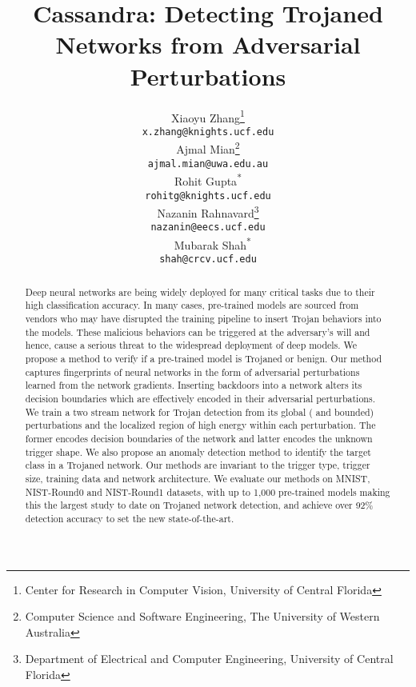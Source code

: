 \documentclass{article}
\title{Cassandra: Detecting Trojaned Networks from Adversarial Perturbations}
\author{
    Xiaoyu Zhang\thanks{Center for Research in Computer Vision, University of Central Florida} \\
    \texttt{x.zhang@knights.ucf.edu} \\
    \And
    Ajmal Mian\thanks{Computer Science and Software Engineering, The University of Western Australia} \\
    \texttt{ajmal.mian@uwa.edu.au} \\
    \And
    Rohit Gupta\textsuperscript{*} \\
    \texttt{rohitg@knights.ucf.edu} \\
    \And
    Nazanin Rahnavard\thanks{Department of Electrical and Computer Engineering, University of Central Florida} \\
    \texttt{nazanin@eecs.ucf.edu} \\\
    \And
    Mubarak Shah\textsuperscript{*} \\
    \texttt{shah@crcv.ucf.edu} \\
}
\begin{document}
\maketitle

\begin{abstract}





\vspace{-3mm}
Deep neural networks are being widely deployed for many critical tasks due to their high classification accuracy. In many cases, pre-trained models are sourced from vendors who may have disrupted the training pipeline to insert Trojan behaviors into the models. These malicious behaviors can be triggered at the adversary's will and hence, cause a serious threat to the widespread deployment of deep models. We propose a method to verify if a pre-trained model is Trojaned or benign. Our method captures fingerprints of neural networks in the form of adversarial perturbations learned from the network gradients. Inserting backdoors into a network alters its decision boundaries which are effectively encoded in their adversarial perturbations. We train a two stream network for Trojan detection from its global ( and  bounded) perturbations and the localized region of high energy within each perturbation. The former encodes decision boundaries of the network and latter encodes the unknown trigger shape. We also propose an anomaly detection method to identify the target class in a Trojaned network. Our methods are invariant to the trigger type, trigger size, training data and network architecture. We evaluate our methods on MNIST, NIST-Round0 and NIST-Round1 datasets, with up to 1,000 pre-trained models making this the largest study to date on Trojaned network detection, and achieve over 92\% detection accuracy to set the new state-of-the-art.
\end{abstract}





\vspace{-5mm}
\end{document}
